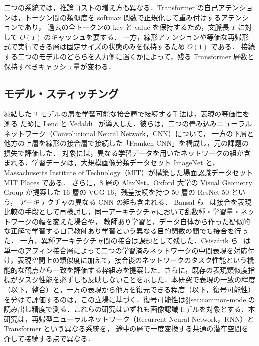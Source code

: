 \documentclass[techrep,noauthor]{ipsj}
\begin{document}
二つの系統では，推論コストの増え方も異なる．Transformer の自己アテンションは，トークン間の類似度を softmax 関数で正規化して重み付けするアテンションであり，
過去の全トークンの key と value を保持するため，文脈長 $T$ に対して $O(T)$ のキャッシュを要する．
一方，線形アテンションや等価な再帰形式で実行できる層は固定サイズの状態のみを保持するため $O(1)$ である．
接続する二つのモデルのどちらを入力側に置くかによって，残る Transformer 層数と保持すべきキャッシュ量が変わる．

\subsection{モデル・スティッチング}
凍結した $2$ モデルの層を学習可能な接合層で接続する手法は，表現の等価性を測る
ために Lenc と Vedaldi~\cite{10.1007/s11263-018-1098-y} が導入した．彼らは，二つの畳み込みニューラルネットワーク（Convolutional Neural Network，CNN）について，
一方の下層と他方の上層を線形の接合層で接続した「Franken-CNN」を構成し，元の課題の損失で評価した．
対象には，異なる学習データを用いたネットワークの組が含まれる．学習データは，大規模画像分類データセット ImageNet と，
Massachusetts Institute of Technology（MIT）が構築した場面認識データセット MIT Places である．
さらに，8 層の AlexNet，Oxford 大学の Visual Geometry Group が提案した 16 層の VGG-16，残差接続を持つ 50 層の ResNet-50 という，
アーキテクチャの異なる CNN の組も含まれる．
Bansal ら~\cite{3540261.3540279} は接合を表現比較の手段として再検討し，同一アーキテクチャにおいて乱数種・学習量・ネットワークの幅を変えた場合や，
教師あり学習と，データ自体から作った疑似的な正解で学習する自己教師あり学習という異なる目的関数の間でも接合を行った．
一方，異種アーキテクチャ間の接合は課題として残した．Csisz\'arik ら~\cite{NEURIPS2021_2cb274e6} は単一のアフィン接合層によって二つの学習済みネットワークの中間表現を対応付け，表現空間上の類似度に加えて，接合後のネットワークのタスク性能という機能的な観点から一致を評価する枠組みを提案した．さらに，既存の表現類似度指標がタスク性能を必ずしも反映しないことを示した．本研究で表現の一致の程度（以下，整合）と，一方の表現から他方を復元できる程度（以下，復号可能性）を分けて評価するのは，この立場に基づく．復号可能性は\S\ref{sec:common-mode}の読み出し精度で測る．これらの研究はいずれも画像認識モデルを対象とする．本研究は，再帰型ニューラルネットワーク（Recurrent Neural Network，RNN）と Transformer という異なる系統を，
途中の層で一度変換する共通の潜在空間を介して接続する点で異なる．
\end{document}
